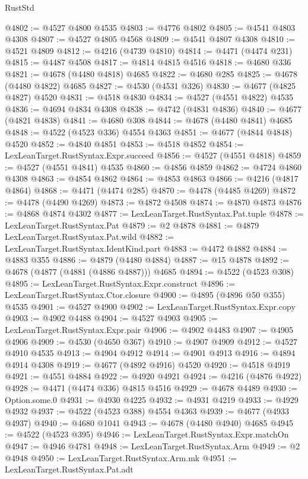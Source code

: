 \begin{lexlean}{RustStd}
\begin{coremodule}
@4802 := @4527 @4800 @4535
@4803 := @4776 @4802
@4805 := @4541 @4803 @4308
@4807 := @4527 @4805 @4568
@4809 := @4541 @4807 @4308
@4810 := @4521 @4809
@4812 := @4216 (@4739 @4810)
@4814 := @4471 (@4474 @231)
@4815 := @4487 @4508
@4817 := @4814 @4815 @4516
@4818 := @4680 @336
@4821 := @4678 (@4480 @4818) @4685
@4822 := @4680 @285
@4825 := @4678 (@4480 @4822) @4685
@4827 := @4530 (@4531 @326)
@4830 := @4677 (@4825 @4827) @4520
@4831 := @4518 @4830
@4834 := @4527 (@4551 @4822) @4535
@4836 := @4694 @4834 @4308
@4838 := @4742 (@4831 @4836)
@4840 := @4677 (@4821 @4838)
@4841 := @4680 @308
@4844 := @4678 (@4480 @4841) @4685
@4848 := @4522 (@4523 @336) @4554 @4363
@4851 := @4677 (@4844 @4848) @4520
@4852 := @4840 @4851
@4853 := @4518 @4852
@4854 := LexLeanTarget.RustSyntax.Expr.succeed
@4856 := @4527 (@4551 @4818)
@4859 := @4527 (@4551 @4841) @4535
@4860 := @4856 @4859
@4862 := @4724 @4860 @4308
@4863 := @4854 @4862
@4864 := @4853 @4863
@4866 := @4216 (@4817 @4864)
@4868 := @4471 (@4474 @285)
@4870 := @4478 (@4485 @4269)
@4872 := @4478 (@4490 @4269)
@4873 := @4872 @4508
@4874 := @4870 @4873
@4876 := @4868 @4874 @4302
@4877 := LexLeanTarget.RustSyntax.Pat.tuple
@4878 := LexLeanTarget.RustSyntax.Pat
@4879 := @2 @4878
@4881 := @4879 LexLeanTarget.RustSyntax.Pat.wild
@4882 := LexLeanTarget.RustSyntax.IdentKind.part
@4883 := @4472 @4882
@4884 := @4883 @355
@4886 := @4879 (@4480 @4884)
@4887 := @15 @4878
@4892 := @4678 (@4877 (@4881 (@4886 @4887))) @4685
@4894 := @4522 (@4523 @308)
@4895 := LexLeanTarget.RustSyntax.Expr.construct
@4896 := LexLeanTarget.RustSyntax.Ctor.closure
@4900 := @4895 (@4896 @50 @355) @4535
@4901 := @4527 @4900
@4902 := LexLeanTarget.RustSyntax.Expr.copy
@4903 := @4902 @4488
@4904 := @4527 @4903
@4905 := LexLeanTarget.RustSyntax.Expr.pair
@4906 := @4902 @4483
@4907 := @4905 @4906
@4909 := @4530 (@4650 @367)
@4910 := @4907 @4909
@4912 := @4527 @4910 @4535
@4913 := @4904 @4912
@4914 := @4901 @4913
@4916 := @4894 @4914 @4308
@4919 := @4677 (@4892 @4916) @4520
@4920 := @4518 @4919
@4921 := @4551 @4884
@4922 := @4920 @4921
@4924 := @4216 (@4876 @4922)
@4928 := @4471 (@4474 @336) @4815 @4516
@4929 := @4678 @4489
@4930 := Option.some.{0}
@4931 := @4930 @4225
@4932 := @4931 @4219
@4933 := @4929 @4932
@4937 := @4522 (@4523 @388) @4554 @4363
@4939 := @4677 (@4933 @4937)
@4940 := @4680 @1041
@4943 := @4678 (@4480 @4940) @4685
@4945 := @4522 (@4523 @395)
@4946 := LexLeanTarget.RustSyntax.Expr.matchOn
@4947 := @4946 @4781
@4948 := LexLeanTarget.RustSyntax.Arm
@4949 := @2 @4948
@4950 := LexLeanTarget.RustSyntax.Arm.mk
@4951 := LexLeanTarget.RustSyntax.Pat.adt

\end{coremodule}
\end{lexlean}

